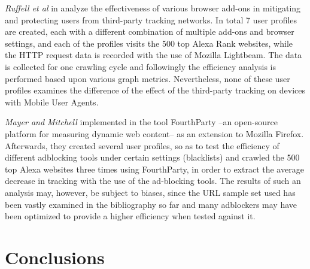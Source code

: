 \documentclass{sig-alternate}
\begin{document}
\textit{Ruffell et al} in \cite{ruffel2015} analyze the effectiveness of various browser add-ons in mitigating and protecting users from third-party tracking networks. In total 7 user profiles are created, each with a different combination of multiple add-ons and browser settings, and each of the profiles visits the 500 top Alexa Rank websites, while the HTTP request data is recorded with the use of Mozilla Lightbeam. The data is collected for one crawling cycle and followingly the efficiency analysis is performed based upon various graph metrics. Nevertheless, none of these user profiles examines the difference of the effect of the third-party tracking on devices with Mobile User Agents.

\textit{Mayer and Mitchell} implemented in \cite{mayer} the tool FourthParty --an open-source platform for measuring dynamic web content-- as an extension to Mozilla Firefox. Afterwards, they created several user profiles, so as to test the efficiency of different adblocking tools under certain settings (blacklists) and crawled the 500 top Alexa websites three times using FourthParty, in order to extract the average decrease in tracking with the use of the ad-blocking tools. The results of such an analysis may, however, be subject to biases, since the URL sample set used has been vastly examined in the bibliography so far and many adblockers may have been optimized to provide a higher efficiency when tested against it.


\section{Conclusions} \label{sec:conclusions}



\end{document}
